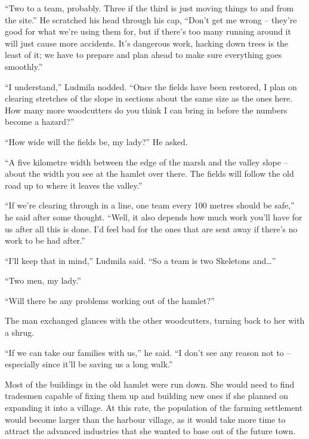  

“Two to a team, probably. Three if the third is just moving things to and from the site.” He scratched his head through his cap, “Don’t get me wrong – they’re good for what we’re using them for, but if there’s too many running around it will just cause more accidents. It’s dangerous work, hacking down trees is the least of it; we have to prepare and plan ahead to make sure everything goes smoothly.”

 

“I understand,” Ludmila nodded. “Once the fields have been restored, I plan on clearing stretches of the slope in sections about the same size as the ones here. How many more woodcutters do you think I can bring in before the numbers become a hazard?”

 

“How wide will the fields be, my lady?” He asked.

 

“A five kilometre width between the edge of the marsh and the valley slope – about the width you see at the hamlet over there. The fields will follow the old road up to where it leaves the valley.”

 

“If we’re clearing through in a line, one team every 100 metres should be safe,” he said after some thought. “Well, it also depends how much work you’ll have for us after all this is done. I’d feel bad for the ones that are sent away if there’s no work to be had after.”

 

“I’ll keep that in mind,” Ludmila said. “So a team is two Skeletons and…”

 

“Two men, my lady.”

 

“Will there be any problems working out of the hamlet?”

 

The man exchanged glances with the other woodcutters, turning back to her with a shrug.

 

“If we can take our families with us,” he said. “I don’t see any reason not to – especially since it’ll be saving us a long walk.”

 

Most of the buildings in the old hamlet were run down. She would need to find tradesmen capable of fixing them up and building new ones if she planned on expanding it into a village. At this rate, the population of the farming settlement would become larger than the harbour village, as it would take more time to attract the advanced industries that she wanted to base out of the future town.

